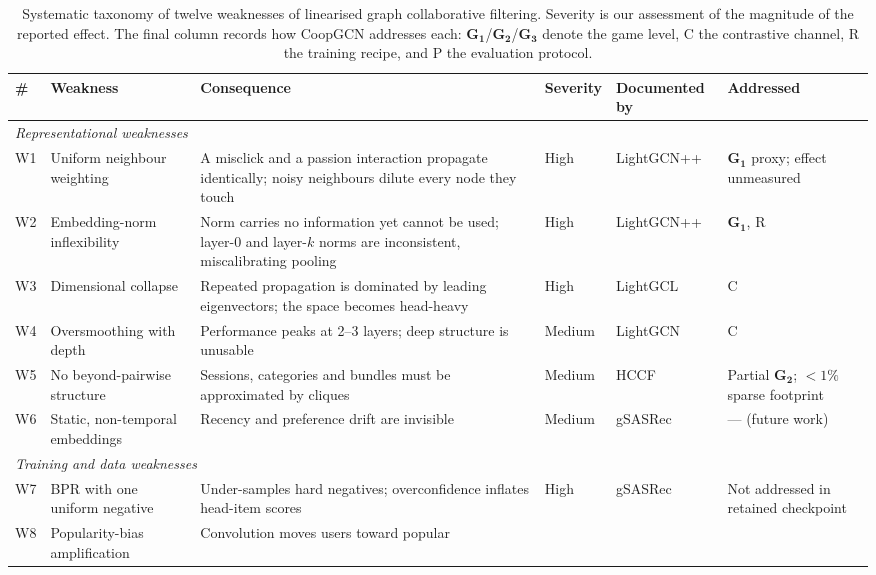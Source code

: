 \documentclass[a4paper,fleqn,longmktitle]{cas-dc}
\begin{document}
\begin{table}[t]
\centering
\caption{Systematic taxonomy of twelve weaknesses of linearised graph
collaborative filtering. Severity is our assessment of the magnitude of the
reported effect. The final column records how CoopGCN addresses each:
$\mathbf{G_1}$/$\mathbf{G_2}$/$\mathbf{G_3}$ denote the game level, C the
contrastive channel, R the training recipe, and P the evaluation protocol.}
\label{tab:weaknesses}
\small
\begin{tabular}{llp{6.5cm}lp{3.0cm}l}
\toprule
\textbf{\#} & \textbf{Weakness} & \textbf{Consequence} & \textbf{Severity} &
\textbf{Documented by} & \textbf{Addressed} \\
\midrule
\multicolumn{6}{l}{\textit{Representational weaknesses}} \\
\midrule
W1 & Uniform neighbour weighting & A misclick and a passion interaction
propagate identically; noisy neighbours dilute every node they touch & High &
LightGCN++ \citep{lee2024lightgcnpp} & $\mathbf{G_1}$ proxy; effect unmeasured \\
W2 & Embedding-norm inflexibility & Norm carries no information yet cannot be
used; layer-0 and layer-$k$ norms are inconsistent, miscalibrating pooling &
High & LightGCN++ \citep{lee2024lightgcnpp} & $\mathbf{G_1}$, R \\
W3 & Dimensional collapse & Repeated propagation is dominated by leading
eigenvectors; the space becomes head-heavy & High & LightGCL
\citep{cai2023lightgcl} & C \\
W4 & Oversmoothing with depth & Performance peaks at 2--3 layers; deep
structure is unusable & Medium & LightGCN \citep{he2020lightgcn} & C \\
W5 & No beyond-pairwise structure & Sessions, categories and bundles must be
approximated by cliques & Medium & HCCF \citep{xia2022hccf} & Partial
$\mathbf{G_2}$; $<1\%$ sparse footprint \\
W6 & Static, non-temporal embeddings & Recency and preference drift are
invisible & Medium & gSASRec \citep{petrov2023gsasrec} & --- (future work) \\
\midrule
\multicolumn{6}{l}{\textit{Training and data weaknesses}} \\
\midrule
W7 & BPR with one uniform negative & Under-samples hard negatives;
overconfidence inflates head-item scores & High & gSASRec
\citep{petrov2023gsasrec} & Not addressed in retained checkpoint \\
W8 & Popularity-bias amplification & Convolution moves users toward popular

\end{tabular}
\end{table}
\end{document}

